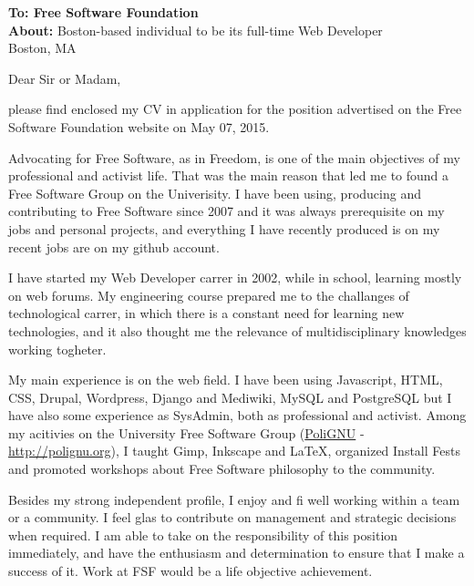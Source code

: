 \documentclass[]{friggeri-cover-letter}
\begin{document}
\thispagestyle{empty}
%
%

\textbf{To: Free Software Foundation}\\
\textbf{About:} Boston-based individual to be its full-time Web Developer\\
Boston, MA

\vfill

Dear Sir or Madam,

\vfill

please find enclosed my CV in application for the position advertised on the Free Software Foundation website on May 07, 2015.

Advocating for Free Software, as in Freedom, is one of the main objectives of my professional and activist life.
That was the main reason that led me to found a Free Software Group on the Univerisity. I have been using, producing and contributing to Free Software since 2007 and it was always prerequisite on my jobs and personal projects, and everything I have recently produced is on my recent jobs are on my github account.

I have started my Web Developer carrer in 2002, while in school, learning mostly on web forums. My engineering course prepared me to the challanges of technological carrer, in which there is a constant need for learning new technologies, and it also thought me the relevance of multidisciplinary knowledges working togheter.

My main experience is on the web field. I have been using Javascript, HTML, CSS, Drupal, Wordpress, Django and Mediwiki, MySQL and PostgreSQL but I have also some experience as SysAdmin, both as professional and activist.
Among my acitivies on the University Free Software Group (\href{http://polignu.org}{PoliGNU} - \url{http://polignu.org}), I taught Gimp, Inkscape and LaTeX, organized Install Fests and promoted workshops about Free Software philosophy to the community.

Besides my strong independent profile, I enjoy and fi well working within a team or a community. I feel glas to contribute on management and strategic decisions when required. I am able to take on the responsibility of this position immediately, and have the enthusiasm and determination to ensure that I make a success of it. Work at FSF would be a life objective achievement.
\end{document}
